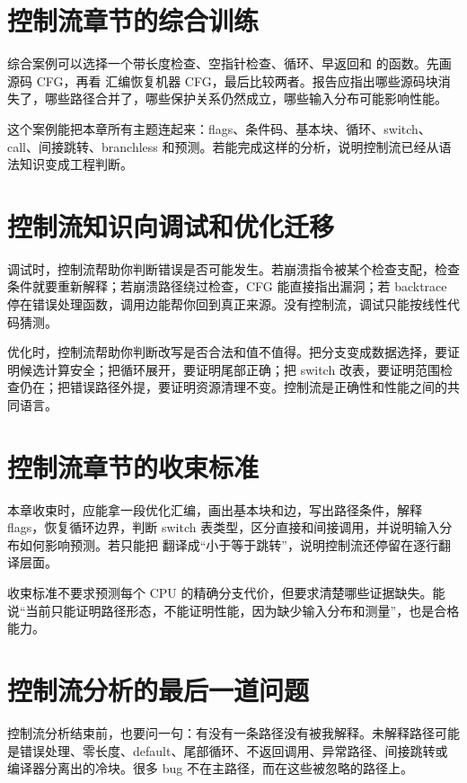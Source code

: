 \section{控制流章节的综合训练}

综合案例可以选择一个带长度检查、空指针检查、循环、早返回和  的函数。先画源码 CFG，再看  汇编恢复机器 CFG，最后比较两者。报告应指出哪些源码块消失了，哪些路径合并了，哪些保护关系仍然成立，哪些输入分布可能影响性能。

这个案例能把本章所有主题连起来：flags、条件码、基本块、循环、switch、call、间接跳转、branchless 和预测。若能完成这样的分析，说明控制流已经从语法知识变成工程判断。

\section{控制流知识向调试和优化迁移}

调试时，控制流帮助你判断错误是否可能发生。若崩溃指令被某个检查支配，检查条件就要重新解释；若崩溃路径绕过检查，CFG 能直接指出漏洞；若 backtrace 停在错误处理函数，调用边能帮你回到真正来源。没有控制流，调试只能按线性代码猜测。

优化时，控制流帮助你判断改写是否合法和值不值得。把分支变成数据选择，要证明候选计算安全；把循环展开，要证明尾部正确；把 switch 改表，要证明范围检查仍在；把错误路径外提，要证明资源清理不变。控制流是正确性和性能之间的共同语言。

\section{控制流章节的收束标准}

本章收束时，应能拿一段优化汇编，画出基本块和边，写出路径条件，解释 flags，恢复循环边界，判断 switch 表类型，区分直接和间接调用，并说明输入分布如何影响预测。若只能把  翻译成“小于等于跳转”，说明控制流还停留在逐行翻译层面。

收束标准不要求预测每个 CPU 的精确分支代价，但要求清楚哪些证据缺失。能说“当前只能证明路径形态，不能证明性能，因为缺少输入分布和测量”，也是合格能力。

\section{控制流分析的最后一道问题}

控制流分析结束前，也要问一句：有没有一条路径没有被我解释。未解释路径可能是错误处理、零长度、default、尾部循环、不返回调用、异常路径、间接跳转或编译器分离出的冷块。很多 bug 不在主路径，而在这些被忽略的路径上。


